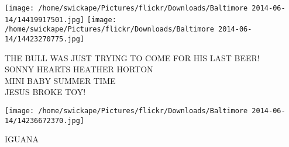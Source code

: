 \documentclass[10pt,letterpaper]{article}
\begin{document}
\texttt{[image: /home/swickape/Pictures/flickr/Downloads/Baltimore 2014-06-14/14419917501.jpg]}
\texttt{[image: /home/swickape/Pictures/flickr/Downloads/Baltimore 2014-06-14/14423270775.jpg]}

THE BULL WAS JUST TRYING TO COME FOR HIS LAST BEER!\\
SONNY HEARTS HEATHER HORTON\\
MINI BABY SUMMER TIME\\
JESUS BROKE TOY!\\
\pagebreak

\texttt{[image: /home/swickape/Pictures/flickr/Downloads/Baltimore 2014-06-14/14236672370.jpg]}

IGUANA\\
\pagebreak
\end{document}
